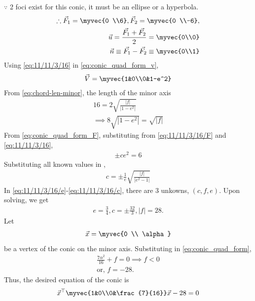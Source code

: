 $\because$ 2 foci exist for this conic, it must be an ellipse or a hyperbola.
\begin{align}
	\therefore 
	\label{eq:11/11/3/16/F}
	\vec{F}_1 =\myvec{0 \\6}, \vec{F}_2 = \myvec{0 \\-6}, 
	\\
\vec{u} =\frac{\vec{F_1}+\vec{F_2}}{2}=\myvec{0\\0}
\\
\vec{n}\equiv\vec{F_1}-\vec{F_2}\equiv\myvec{0\\1}
	\label{eq:11/11/3/16}
\end{align}
Using 
	\eqref{eq:11/11/3/16}
	in
  \eqref{eq:conic_quad_form_v},
\begin{align}
 \vec{V} = \myvec{1&0\\0&1-e^2}
\end{align}
From \eqref{eq:chord-len-minor}, the length of the minor axis
\begin{align}
 16 = 2\sqrt{\frac{|f|}{|1-e^2|}}
 \\
	\implies
8\sqrt{|1-e^2|}=\sqrt{|f|}
	\label{eq:11/11/3/16/e}
\end{align}
  From \eqref{eq:conic_quad_form_F}, substituting from 
	\eqref{eq:11/11/3/16/F}
	and 
	\eqref{eq:11/11/3/16},
\begin{align}
	\label{eq:11/11/3/16/c1}
\pm ce^2=6
\end{align}
Substituting all known values in
\label{eq:conic_quad_form_nc}, 
\begin{align}
c=\pm\frac{1}{e}\sqrt{\frac{|f|}{|e^2-1|}}
	\label{eq:11/11/3/16/c}
\end{align}
	In \eqref{eq:11/11/3/16/e}-\eqref{eq:11/11/3/16/c}, there are 3 unkowns, $(c, f, e)$.  
Upon solving, we get 
\begin{align}
e=\frac{3}{4}, c=\pm\frac{32}{3}, |f|=28.
\end{align}
Let
\begin{align}
 \vec{x}= \myvec{0 \\ \alpha}
\end{align}
be a vertex of the conic on the minor axis.  Substituting in
    \eqref{eq:conic_quad_form},
\begin{align}
\frac{7\alpha^2}{16}+f=0 \implies f < 0
\\
	\text{or, }
f = -28.
\end{align}
Thus, the desired 
equation of the conic is
\begin{align}
\vec{x}^\top\myvec{1&0\\0&\frac{7}{16}}\vec{x}-28 = 0
\end{align}

